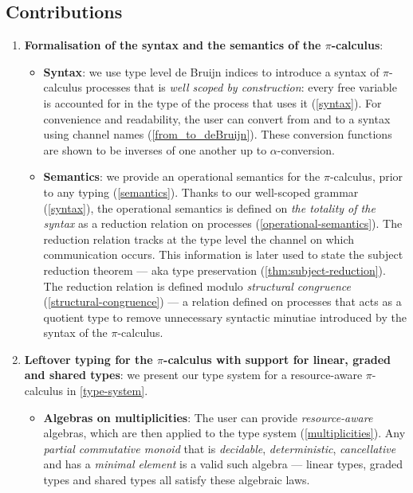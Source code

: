 \documentclass[sigplan,10pt,anonymous,review]{acmart}
\theoremstyle{definition}
\newcommand{\picalc}{$\pi$-calculus}
\begin{document}
\subsection{Contributions}
\begin{enumerate}
\item \textbf{Formalisation of the syntax and the semantics of the \picalc{}}:
 \begin{itemize}
   \item \textbf{Syntax}: we use type level {de Bruijn indices} \cite{deBruijn1972, Dybjer1994} to introduce a syntax of \picalc{} processes that is \emph{well scoped by construction}: every free variable is accounted for in the type of the process that uses it (\autoref{syntax}).
   For convenience and readability, the user can convert from and to a syntax using channel names (\autoref{from_to_deBruijn}).
   These conversion functions are shown to be inverses of one another up to $\alpha$-conversion.
   
   \item \textbf{Semantics}: we provide an operational semantics for the \picalc{}, prior to any typing (\autoref{semantics}).
   Thanks to our well-scoped grammar  (\autoref{syntax}), the operational semantics is defined on \emph{the totality of the syntax} as a reduction relation on processes (\autoref{operational-semantics}).
   The reduction relation tracks at the type level the channel on which communication occurs. This information is later used to state the subject reduction theorem --- aka type preservation (\autoref{thm:subject-reduction}).
   The reduction relation is defined modulo \emph{structural congruence} (\autoref{structural-congruence}) --- a relation defined on processes that acts as a quotient type to remove unnecessary syntactic minutiae introduced by the syntax of the \picalc{}.
 \end{itemize}
  
  \item \textbf{Leftover typing for the \picalc{} with support for linear, graded and shared types}:
  we present our type system for a resource-aware \picalc{} in \autoref{type-system}.
  \begin{itemize}
    \item \textbf{Algebras on multiplicities}: The user can provide \emph{resource-aware} algebras, which are then applied to the type system (\autoref{multiplicities}).
    Any \emph{partial commutative monoid} that is \emph{decidable}, \emph{deterministic}, \emph{cancellative} and has a \emph{minimal element} is a valid such algebra --- linear types, graded types and shared types all satisfy these algebraic laws.


\end{itemize}
\end{enumerate}
\end{document}
